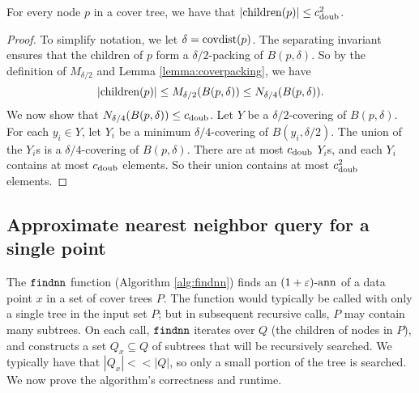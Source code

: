\documentclass[../main.tex]{subfiles}
\newcommand{\cdoub}{c_\textnormal{doub}}
\newcommand{\p}{\ensuremath p}
\newcommand{\mkfunction}[1]{\ifmmode{\textnormal{{#1}}}}
\newcommand{\children}[1]   {\mkfunction{children}({#1})}
\newcommand{\covdist}[1]    {\mkfunction{covdist}({#1})}
\newcommand{\mkprocedure}[1]{\textnormal{\ttfamily {#1}}}
\newcommand{\findnn}{\mkprocedure{findnn}}
\begin{document}

\begin{lemma}
    \label{lemma:children}
    For every node $p$ in a cover tree, we have that
    $|\children\p| \le \cdoub^2$.
\end{lemma}

\begin{proof}
    To simplify notation, we let $\delta=\covdist{p}$.
    The separating invariant ensures that the children of $p$ form a $\delta/2$-packing of $B(p,\delta)$.
    So by the definition of $M_{\delta/2}$ and Lemma \ref{lemma:coverpacking}, we have
    \begin{equation}
        |\children{p}| 
        \le M_{\delta/2}(B(p,\delta)) 
        \le N_{\delta/4}(B(p,\delta)) 
        .
    \end{equation}
    We now show that $N_{\delta/4}(B(p,\delta))\le\cdoub$.
    Let $Y$ be a $\delta/2$-covering of $B(p,\delta)$.
    For each $y_i\in Y$, let $Y_i$ be a minimum $\delta/4$-covering of $B(y_i,\delta/2)$.
    The union of the $Y_i$s is a $\delta/4$-covering of $B(p,\delta)$.
    There are at most $\cdoub$ $Y_i$s, and each $Y_i$ contains at most $\cdoub$ elements.
    So their union contains at most $\cdoub^2$ elements.
\end{proof}

\subsection{Approximate nearest neighbor query for a single point}

The $\findnn$ function (Algorithm \ref{alg:findnn}) finds an $(1+\varepsilon)\text{-ann}$ of a data point $x$ in a set of cover trees $P$.
The function would typically be called with only a single tree in the input set $P$;
but in subsequent recursive calls, $P$ may contain many subtrees. 
On each call,
$\findnn$ iterates over $Q$ (the children of nodes in $P$),
and constructs a set $Q_x \subseteq Q$ of subtrees that will be recursively searched.
We typically have that $|Q_x| <\!\!< |Q|$,
so only a small portion of the tree is searched.
We now prove the algorithm's correctness and runtime.
\end{document}
